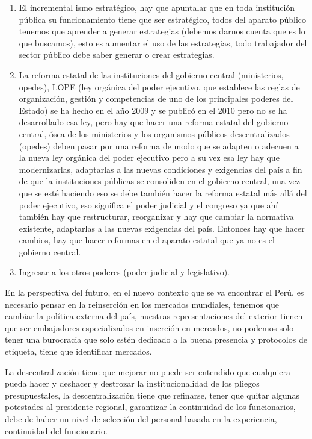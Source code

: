 \documentclass[
  jou,
  floatsintext,
  longtable,
  a4paper,
  nolmodern,
  notxfonts,
  notimes,
  12pt,
  colorlinks=true,linkcolor=blue,citecolor=blue,urlcolor=blue]{apa7}
\providecommand{\tightlist}{%
  \setlength{\itemsep}{0pt}\setlength{\parskip}{0pt}}
\begin{document}
\begin{enumerate}
\def\labelenumi{\arabic{enumi}.}
\tightlist
\item
  El incremental ismo estratégico, hay que apuntalar que en toda
  institución pública su funcionamiento tiene que ser estratégico, todos
  del aparato público tenemos que aprender a generar estrategias
  (debemos darnos cuenta que es lo que buscamos), esto es aumentar el
  uso de las estrategias, todo trabajador del sector público debe saber
  generar o crear estrategias.
\item
  La reforma estatal de las instituciones del gobierno central
  (ministerios, opedes), LOPE (ley orgánica del poder ejecutivo, que
  establece las reglas de organización, gestión y competencias de uno de
  los principales poderes del Estado) se ha hecho en el año 2009 y se
  publicó en el 2010 pero no se ha desarrollado esa ley, pero hay que
  hacer una reforma estatal del gobierno central, ósea de los
  ministerios y los organismos públicos descentralizados (opedes) deben
  pasar por una reforma de modo que se adapten o adecuen a la nueva ley
  orgánica del poder ejecutivo pero a su vez esa ley hay que
  modernizarlas, adaptarlas a las nuevas condiciones y exigencias del
  país a fin de que la instituciones públicas se consoliden en el
  gobierno central, una vez que se esté haciendo eso se debe también
  hacer la reforma estatal más allá del poder ejecutivo, eso significa
  el poder judicial y el congreso ya que ahí también hay que
  restructurar, reorganizar y hay que cambiar la normativa existente,
  adaptarlas a las nuevas exigencias del país. Entonces hay que hacer
  cambios, hay que hacer reformas en el aparato estatal que ya no es el
  gobierno central.
\item
  Ingresar a los otros poderes (poder judicial y legislativo).
\end{enumerate}

En la perspectiva del futuro, en el nuevo contexto que se va encontrar
el Perú, es necesario pensar en la reinserción en los mercados
mundiales, tenemos que cambiar la política externa del país, nuestras
representaciones del exterior tienen que ser embajadores especializados
en inserción en mercados, no podemos solo tener una burocracia que solo
estén dedicado a la buena presencia y protocolos de etiqueta, tiene que
identificar mercados.

La descentralización tiene que mejorar no puede ser entendido que
cualquiera pueda hacer y deshacer y destrozar la institucionalidad de
los pliegos presupuestales, la descentralización tiene que refinarse,
tener que quitar algunas potestades al presidente regional, garantizar
la continuidad de los funcionarios, debe de haber un nivel de selección
del personal basada en la experiencia, continuidad del funcionario.
\end{document}
